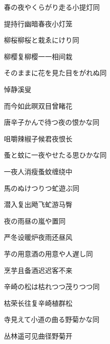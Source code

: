 \begin{haiku}
    {\FH 春の夜やくらがり走る小提灯}\hfill{\FH 同}

    {\FK 提持行幽暗春夜小灯笼}
\end{haiku}

\begin{haiku}
    {\FH 柳桜柳桜と栽ゑにけり}\hfill{\FH 同}

    {\FK 柳樱复柳樱一一相间栽}
\end{haiku}

\begin{haiku}
    {\FH そのままに花を見た目をがれぬ}\hfill{\FH 同}

    {\FK 悼静溪叟}

    {\FK 而今如此暝双目曾睹花}
\end{haiku}

\begin{haiku}
    {\FH 唐辛子かんで待つ夜の恨かな}\hfill{\FH 同}

    {\FK 咀嚼辣椒子候君夜恨长}
\end{haiku}

\begin{haiku}
    {\FH 蚤と蚊に一夜やせたる思ひかな}\hfill{\FH 同}

    {\FK 一夜人消瘦蚤蚊缠绕中}
\end{haiku}

\begin{haiku}
    {\FH 馬のぬけつりつ虻遊ぶ}\hfill{\FH 同}

    {\FK 潜入复出飏飞虻游马臀}
\end{haiku}

\begin{haiku}
    {\FH 夜の雨昼の嵐や置}\hfill{\FH 同}

    {\FK 严冬设暖炉夜雨还昼风}
\end{haiku}

\begin{haiku}
    {\FH 芋の用意酒の用意や人遅し}\hfill{\FH 同}

    {\FK 烹芋且备酒迟迟客不来}
\end{haiku}

\begin{haiku}
    {\FH 辛崎の松は枯れつつ茂りつつ}\hfill{\FH 同}

    {\FK 枯荣长往复辛崎植群松}
\end{haiku}

\begin{haiku}
    {\FH 寺見えて小道の曲る野菊かな}\hfill{\FH 同}

    {\FK 丛林遥可见曲径野菊开}
\end{haiku}


